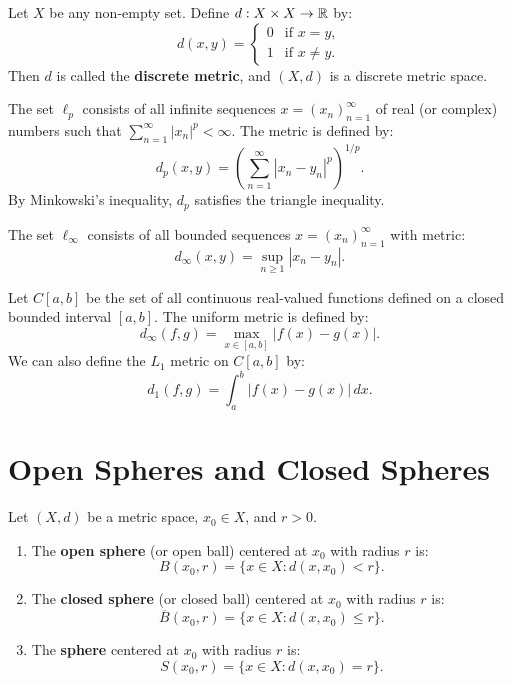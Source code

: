 \begin{example}
Let $X$ be any non-empty set. Define $d: X \times X \to \mathbb{R}$ by:
\[
d(x,y) = \begin{cases} 0 & \text{if } x = y, \\ 1 & \text{if } x \neq y. \end{cases}
\]
Then $d$ is called the \textbf{discrete metric}, and $(X,d)$ is a discrete metric space.
\end{example}

\begin{example}
The set $\ell_p$ consists of all infinite sequences $x = (x_n)_{n=1}^\infty$ of real (or complex) numbers such that $\sum_{n=1}^\infty |x_n|^p < \infty$. The metric is defined by:
\[
d_p(x,y) = \left( \sum_{n=1}^\infty |x_n - y_n|^p \right)^{1/p}.
\]
By Minkowski's inequality, $d_p$ satisfies the triangle inequality.
\end{example}

\begin{example}
The set $\ell_\infty$ consists of all bounded sequences $x = (x_n)_{n=1}^\infty$ with metric:
\[
d_\infty(x,y) = \sup_{n \ge 1} |x_n - y_n|.
\]
\end{example}

\begin{example}
Let $C[a,b]$ be the set of all continuous real-valued functions defined on a closed bounded interval $[a,b]$. The uniform metric is defined by:
\[
d_\infty(f,g) = \max_{x \in [a,b]} |f(x) - g(x)|.
\]
We can also define the $L_1$ metric on $C[a,b]$ by:
\[
d_1(f,g) = \int_a^b |f(x) - g(x)|\,dx.
\]
\end{example}


\section{Open Spheres and Closed Spheres}
\label{sec:spheres}

\begin{definition}
Let $(X,d)$ be a metric space, $x_0 \in X$, and $r > 0$.
\begin{enumerate}[label=\rm{(\roman*)}]
    \item The \textbf{open sphere} (or open ball) centered at $x_0$ with radius $r$ is:
    \[
    B(x_0, r) = \{x \in X : d(x, x_0) < r\}.
    \]
    \item The \textbf{closed sphere} (or closed ball) centered at $x_0$ with radius $r$ is:
    \[
    \overline{B}(x_0, r) = \{x \in X : d(x, x_0) \le r\}.
    \]
    \item The \textbf{sphere} centered at $x_0$ with radius $r$ is:
    \[
    S(x_0, r) = \{x \in X : d(x, x_0) = r\}.
    \]
\end{enumerate}
\end{definition}

